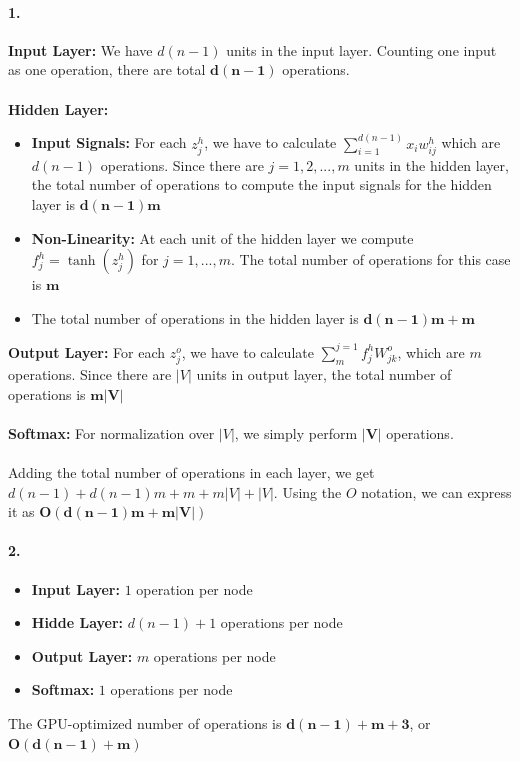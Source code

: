 \documentclass[10pt,letter]{article}
\begin{document}
\paragraph*{1.}
\textbf{Input Layer:} We have $d(n-1)$ units in the input layer. Counting one input as one operation, there are total $\bm{d(n-1)}$ operations.
\\
\\
\textbf{Hidden Layer:} 
\begin{itemize}
	\item \textbf{Input Signals:}  For each $z^h_j$, we have to calculate $\sum_{i=1}^{d(n-1)}x_iw^h_{ij}$ which are $d(n-1)$ operations. Since there are $j = 1, 2, ..., m$ units in the hidden layer, the total number of operations to compute the input signals for the hidden layer is $\bm{d(n-1)m}$
	\item \textbf{Non-Linearity:} At each unit of the hidden layer we compute $f^h_j = \tanh(z^h_j)$ for $j=1,...,m$. The total number of operations for this case is $\bm{m}$
	\item The total number of operations in the hidden layer is $\bm{d(n-1)m + m}$
\end{itemize}


\textbf{Output Layer:}
For each $z^o_j$, we have to calculate $\sum_{m}^{j=1}f^h_jW^o_{jk}$, which are $m$ operations. Since there are $|V|$ units in output layer, the total number of operations is $\bm{m|V|}$
\\
\\
\textbf{Softmax:}
For normalization over $|V|$, we simply perform $\bm{|V|}$ operations. 
\\
\\
Adding the total number of operations in each layer, we get $d(n-1) + d(n-1)m + m + m|V| + |V|$. Using the $O$ notation, we can express it as $\bm{O(d(n-1)m+m|V|)}$ 


\paragraph*{2.}
\begin{itemize}
	\item \textbf{Input Layer:} $1$ operation per node
	\item \textbf{Hidde Layer:} $d(n-1) + 1$ operations per node
	\item \textbf{Output Layer:} $m$ operations per node
	\item \textbf{Softmax:} $1$ operations per node
\end{itemize}
The GPU-optimized number of operations is $\bm{d(n-1) + m + 3}$, or $\bm{ O(d(n-1) + m)}$
\end{document}

